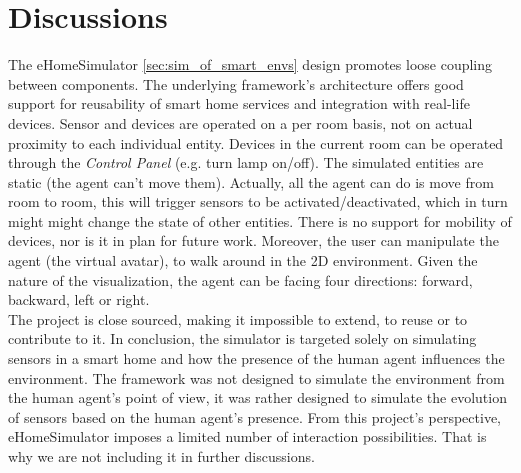 \section{Discussions}\label{sec:discussions}



The eHomeSimulator \ref{sec:sim_of_smart_envs} design promotes loose coupling between components. The underlying framework's architecture offers good support for reusability of smart home services and integration with real-life devices. Sensor and devices are operated on a per room basis, not on actual proximity to each individual entity. Devices in the current room can be operated through the \emph{Control Panel} (e.g. turn lamp on/off). The simulated entities are static (the agent can't move them). Actually, all the agent can do is move from room to room, this will trigger sensors to be activated/deactivated, which in turn might might change the state of other entities. There is no support for mobility of devices, nor is it in plan for future work. Moreover, the user can manipulate the agent (the virtual avatar), to walk around in the 2D environment. Given the nature of the visualization, the agent can be facing four directions: forward, backward, left or right.\\

The project is close sourced, making it impossible to extend, to reuse or to contribute to it. In conclusion, the simulator is targeted solely on simulating sensors in a smart home and how the presence of the human agent influences the environment. The framework was not designed to simulate the environment from the human agent's point of view, it was rather designed to simulate the evolution of sensors based on the human agent's presence. From this project's perspective, eHomeSimulator imposes a limited number of interaction possibilities. That is why we are not including it in further discussions.\\

